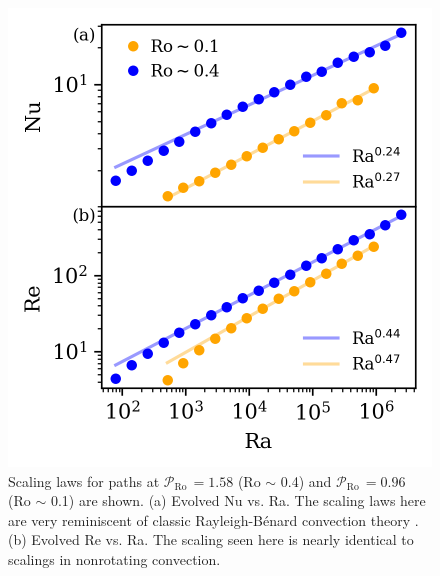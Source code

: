 \documentclass[twocolumn, amsmath, amsfonts, amssymb]{aastex62}
\newcommand{\RB}{Rayleigh-B\'{e}nard }
\newcommand{\pro}{\ensuremath{\mathcal{P}_{\text{Ro}}\,}}
\begin{document}
\begin{figure}[t!]
    \includegraphics{./figs/nu_and_re.png}
    \caption{Scaling laws for paths at $\pro = 1.58$ (Ro $\sim$ 0.4) and
    $\pro = 0.96$ (Ro $\sim$ 0.1) are shown. 
    (a) Evolved Nu vs. Ra. The scaling laws here are very reminiscent of classic \RB convection
    theory \citep{ahlers&all2009}.
    (b) Evolved Re vs. Ra.
    The scaling seen here is nearly identical to scalings in nonrotating convection.
    \label{fig:nu_and_re} }
\end{figure}
\end{document}
